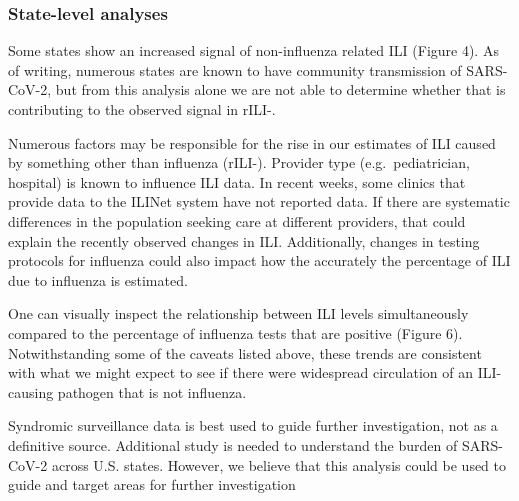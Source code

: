 \documentclass[]{article}
\begin{document}
\hypertarget{state-level-analyses}{%
\subsubsection{State-level analyses}\label{state-level-analyses}}

Some states show an increased signal of non-influenza related ILI
(Figure 4). As of writing, numerous states are known to have community
transmission of SARS-CoV-2, but from this analysis alone we are not able
to determine whether that is contributing to the observed signal in
rILI-.

Numerous factors may be responsible for the rise in our estimates of ILI
caused by something other than influenza (rILI-). Provider type
(e.g.~pediatrician, hospital) is known to influence ILI data. In recent
weeks, some clinics that provide data to the ILINet system have not
reported data. If there are systematic differences in the population
seeking care at different providers, that could explain the recently
observed changes in ILI. Additionally, changes in testing protocols for
influenza could also impact how the accurately the percentage of ILI due
to influenza is estimated.

One can visually inspect the relationship between ILI levels
simultaneously compared to the percentage of influenza tests that are
positive (Figure 6). Notwithstanding some of the caveats listed above,
these trends are consistent with what we might expect to see if there
were widespread circulation of an ILI-causing pathogen that is not
influenza.

Syndromic surveillance data is best used to guide further investigation,
not as a definitive source. Additional study is needed to understand the
burden of SARS-CoV-2 across U.S. states. However, we believe that this
analysis could be used to guide and target areas for further
investigation
\end{document}

